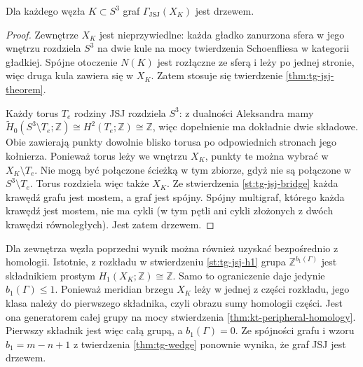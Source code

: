 \begin{stwierdzenie}
\label{st:tg-jsj-knot-tree}
Dla każdego węzła $K\subset S^3$ graf
$\Gamma_{\mathrm{JSJ}}(X_K)$ jest drzewem.
\end{stwierdzenie}
\begin{proof}
Zewnętrze $X_K$ jest nieprzywiedlne: każda gładko
zanurzona sfera w jego wnętrzu rozdziela $S^3$
na dwie kule na mocy twierdzenia Schoenfliesa
w kategorii gładkiej. Spójne otoczenie $N(K)$
jest rozłączne ze sferą i leży po jednej stronie,
więc druga kula zawiera się w $X_K$.
Zatem stosuje się twierdzenie \ref{thm:tg-jsj-theorem}.

Każdy torus $T_e$ rodziny JSJ rozdziela $S^3$:
z dualności Aleksandra mamy
$\widetilde H_0(S^3\setminus T_e;\mathbb Z)
\cong H^2(T_e;\mathbb Z)\cong\mathbb Z$,
więc dopełnienie ma dokładnie dwie składowe.
Obie zawierają punkty dowolnie blisko torusa
po odpowiednich stronach jego kołnierza.
Ponieważ torus leży we wnętrzu $X_K$, punkty te
można wybrać w $X_K\setminus T_e$.
Nie mogą być połączone ścieżką w tym zbiorze,
gdyż nie są połączone w $S^3\setminus T_e$.
Torus rozdziela więc także $X_K$.
Ze stwierdzenia \ref{st:tg-jsj-bridge} każda
krawędź grafu jest mostem, a graf jest spójny.
Spójny multigraf, którego każda krawędź jest
mostem, nie ma cykli (w tym pętli ani cykli
złożonych z dwóch krawędzi równoległych).
Jest zatem drzewem.
\end{proof}

\begin{uwaga}
Dla zewnętrza węzła poprzedni wynik można również
uzyskać bezpośrednio z homologii. Istotnie, z rozkładu
w stwierdzeniu \ref{st:tg-jsj-h1} grupa
$\mathbb Z^{b_1(\Gamma)}$ jest składnikiem prostym
$H_1(X_K;\mathbb Z)\cong\mathbb Z$.
Samo to ograniczenie daje jedynie $b_1(\Gamma)\leq1$.
Ponieważ meridian brzegu $X_K$ leży w jednej z części
rozkładu, jego klasa należy do pierwszego składnika,
czyli obrazu sumy homologii części. Jest ona generatorem
całej grupy na mocy stwierdzenia
\ref{thm:kt-peripheral-homology}. Pierwszy składnik
jest więc całą grupą, a $b_1(\Gamma)=0$.
Ze spójności grafu i wzoru $b_1=m-n+1$
z twierdzenia \ref{thm:tg-wedge} ponownie wynika,
że graf JSJ jest drzewem.
\end{uwaga}

